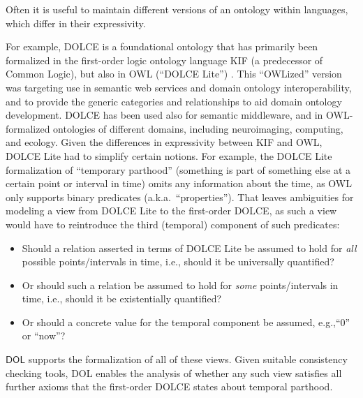 \documentclass[10pt, a4paper]{isov2}
\makeatletter
\newcommand*{\eg}{e.g.,\@\xspace}
\newcommand*{\DOL}{\ensuremath{\mathsf{DOL}}\xspace}
\makeatother
\begin{document}

Often it is useful to maintain different versions of an ontology within languages, which differ in
 their expressivity.


For example,  DOLCE is a foundational ontology that has primarily been formalized in
 the first-order logic
ontology language KIF (a predecessor of Common Logic), but also in OWL (``DOLCE Lite'')
\cite{dolce}. This ``OWLized'' version was targeting use in semantic web services and domain
ontology interoperability, and to provide the generic categories and relationships to aid
 domain ontology development. DOLCE has been used also for semantic middleware, and in
OWL-formalized ontologies of different domains, including neuroimaging, computing, and ecology.
  Given the differences in expressivity between KIF and OWL, DOLCE Lite
   had to simplify certain notions.  For example,
 the DOLCE Lite formalization of ``temporary parthood'' (something is part of something else at a
certain point or interval in time) omits any information about the time, as OWL only supports
binary predicates (a.k.a.\ ``properties'').  That leaves ambiguities for modeling a view from
DOLCE Lite to the first-order DOLCE, as such a view would have to reintroduce the third (temporal)
component of such predicates:
  \begin{itemize}
  \item Should a relation asserted in terms of DOLCE Lite be assumed to hold for \emph{all} possible points/intervals in time, i.e.,  should it be universally quantified?
  \item Or should such a relation be assumed to hold for \emph{some} points/intervals in time, i.e.,  should it be existentially quantified?
  \item Or should a concrete value for the temporal component be assumed, \eg ``0'' or ``now''?
  \end{itemize}
%
\DOL supports the formalization of  all of these views. Given suitable consistency
checking tools, DOL enables the analysis of  whether any such view satisfies all further
 axioms that the  first-order DOLCE states about temporal parthood.
\end{document}
